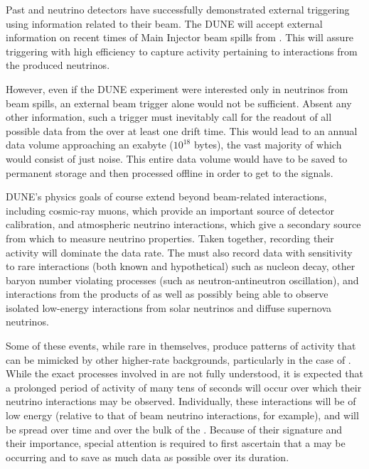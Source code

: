 Past \lartpc and  neutrino detectors have successfully
demonstrated external triggering using information related to their beam. %
The DUNE   will accept external information on recent
times of Main Injector beam spills from \fnal. %
This will assure triggering with high efficiency to capture activity
pertaining to interactions from the produced neutrinos. 

However, even if the DUNE experiment were interested only in 
neutrinos from %
beam spills, an external beam
trigger alone would not be sufficient. 
Absent any other information, such a trigger must inevitably call for
the readout of all possible data from the  %
over at least one \lartpc drift time.
This would lead to an annual data volume approaching an exabyte
($10^{18}$ bytes), the vast majority of which would consist of just noise. 
This entire data volume would have to be saved to permanent storage
and then processed offline in order to get to the signals.

DUNE's physics goals of course extend beyond beam-related interactions, including
cosmic-ray muons, which provide an important
source of detector calibration, and atmospheric neutrino interactions,
which give a secondary source from which to measure neutrino
properties. 
Taken together, %
recording their activity will
dominate the data rate.
The  must also record data with sensitivity to rare interactions
(both known and hypothetical) such as nucleon decay, other baryon
number violating processes (such as neutron-antineutron oscillation),
and interactions from the products of  as well as possibly
being able to observe isolated low-energy interactions from solar
neutrinos and diffuse supernova neutrinos. 

Some of these events, while rare in themselves, produce patterns of
activity that can be mimicked by other higher-rate backgrounds, particularly
in the case of . %
While the exact processes involved in  are not fully understood,
it is expected that a prolonged period of activity of many tens of
seconds will occur over which their neutrino interactions may be
observed. 
Individually, these interactions will be of low energy (relative to
that of beam neutrino interactions, for example), and will be spread
over time and over the bulk of the . 
Because of their signature and their importance, special attention is
required to first ascertain that a  may be occurring and to save as
much data as possible over its duration.

